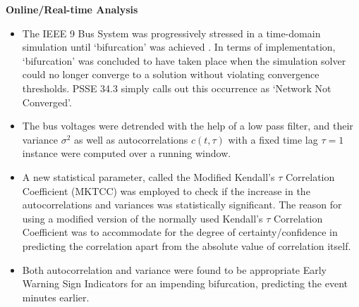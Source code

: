 \noindent\textbf{Online/Real-time Analysis}
\begin{itemize}
	\item The IEEE 9 Bus System was progressively stressed in a time-domain simulation until `bifurcation' was achieved \cite{sanchez01}. In terms of implementation, `bifurcation' was concluded to have taken place when the simulation solver could no longer converge to a solution without violating convergence thresholds. PSSE 34.3 simply calls out this occurrence as `Network Not Converged'.
	\item The bus voltages were detrended with the help of a low pass filter, and their variance $\sigma^2$ as well as autocorrelations $c(t, \tau)$ with a fixed time lag $\tau = 1$ instance were computed over a running window. 
	\item A new statistical parameter, called the Modified Kendall's $\tau$ Correlation Coefficient (MKTCC) was employed to check if the increase in the autocorrelations and variances was statistically significant. The reason for using a modified version of the normally used Kendall's $\tau$ Correlation Coefficient was to accommodate for the degree of certainty/confidence in predicting the correlation apart from the absolute value of correlation itself.
	\item Both autocorrelation and variance were found to be appropriate Early Warning Sign Indicators for an impending bifurcation, predicting the event minutes earlier. 
\end{itemize}